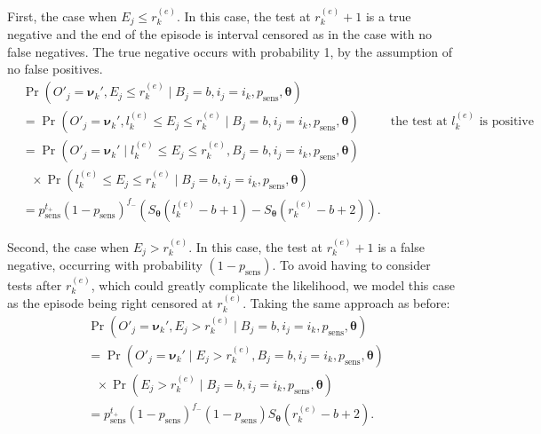 \documentclass{article}
\DeclareMathOperator{\prob}{\mathrm{Pr}}
\renewcommand{\vec}[1]{\bm{#1}}
\newcommand{\psens}{p_\text{sens}}
\newcommand{\sched}{\mathcal{T}}
\begin{document}
First, the case when $E_j \leq r_k^{(e)}$.
In this case, the test at $r_k^{(e)}+1$ is a true negative and the end of the episode is interval censored as in the case with no false negatives.
The true negative occurs with probability 1, by the assumption of no false positives.
\begin{align}
&\prob(O'_j = \vec{\nu}_k', E_j \leq r_k^{(e)} \mid B_j = b, i_j = i_k, \psens, \vec{\theta}) \\
&= \prob(O'_j = \vec{\nu}_k', l_k^{(e)} \leq E_j \leq r_k^{(e)} \mid B_j = b, i_j = i_k, \psens, \vec{\theta}) &\text{the test at $l_k^{(e)}$ is positive} \\
&= \prob(O'_j = \vec{\nu}_k' \mid l_k^{(e)} \leq E_j \leq r_k^{(e)}, B_j = b, i_j = i_k, \psens, \vec{\theta}) \\
&\ \ \  \times \prob(l_k^{(e)} \leq E_j \leq r_k^{(e)} \mid B_j = b, i_j = i_k, \psens, \vec{\theta}) \\
&= p_\text{sens}^{t_+} (1 - p_\text{sens})^{f_-} \left( S_{\vec{\theta}}(l_k^{(e)} - b + 1) - S_{\vec{\theta}}(r_k^{(e)} - b + 2) \right).
\label{imperf-test:eq:ll-ei-lt-ri}
\end{align}

Second, the case when $E_j > r_k^{(e)}$.
In this case, the test at $r_k^{(e)}+1$ is a false negative, occurring with probability $(1 - p_\text{sens})$.
To avoid having to consider tests after $r_k^{(e)}$, which could greatly complicate the likelihood, we model this case as the episode being right censored at $r_k^{(e)}$.
Taking the same approach as before:
\begin{align}
&\prob(O'_j = \vec{\nu}_k', E_j > r_k^{(e)} \mid B_j = b, i_j = i_k, \psens, \vec{\theta}) \\
&= \prob(O'_j = \vec{\nu}_k' \mid E_j > r_k^{(e)}, B_j = b, i_j = i_k, \psens, \vec{\theta}) \\
  &\ \ \  \times \prob(E_j > r_k^{(e)} \mid B_j = b, i_j = i_k, \psens, \vec{\theta}) \\
&= p_\text{sens}^{t_+} (1 - p_\text{sens})^{f_-} (1 - p_\text{sens}) S_{\vec{\theta}}(r_k^{(e)} - b + 2).
\label{imperf-test:eq:ll-ei-gt-ri}
\end{align}
\end{document}
